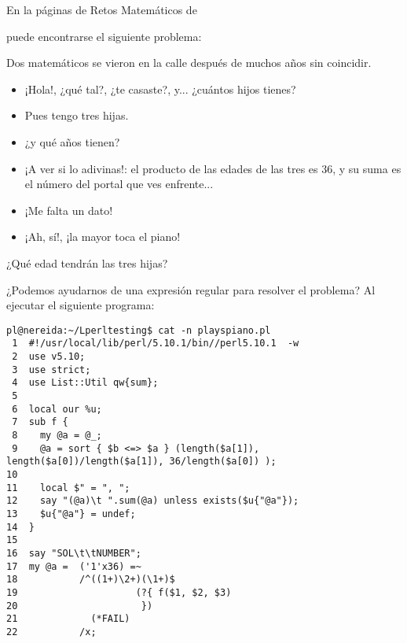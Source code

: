 \label{parrfo:lastreshijas}

En la páginas de Retos Matemáticos de


puede encontrarse el siguiente problema:

\begin{exercise}
Dos matemáticos se vieron en la calle después de muchos años sin coincidir.

\begin{itemize}
\item  ¡Hola!, ¿qué tal?, ¿te casaste?, y... ¿cuántos hijos tienes?
\item  Pues tengo tres hijas.
\item  ¿y qué años tienen?
\item  ¡A ver si lo adivinas!: el producto de las edades de las tres es 36, y su suma es el número del portal que ves enfrente...
\item  ¡Me falta un dato!
\item  ¡Ah, sí!, ¡la mayor toca el piano!
\end{itemize}

%

¿Qué edad tendrán las tres hijas?

¿Podemos ayudarnos de una expresión regular para resolver el problema?
Al ejecutar el siguiente programa:
 
\begin{verbatim}
pl@nereida:~/Lperltesting$ cat -n playspiano.pl
 1  #!/usr/local/lib/perl/5.10.1/bin//perl5.10.1  -w
 2  use v5.10;
 3  use strict;
 4  use List::Util qw{sum};
 5
 6  local our %u;
 7  sub f {
 8    my @a = @_;
 9    @a = sort { $b <=> $a } (length($a[1]), length($a[0])/length($a[1]), 36/length($a[0]) );
10
11    local $" = ", ";
12    say "(@a)\t ".sum(@a) unless exists($u{"@a"});
13    $u{"@a"} = undef;
14  }
15
16  say "SOL\t\tNUMBER";
17  my @a =  ('1'x36) =~
18           /^((1+)\2+)(\1+)$
19                     (?{ f($1, $2, $3)
20                      })
21             (*FAIL)
22           /x;
\end{verbatim}


\end{exercise}
